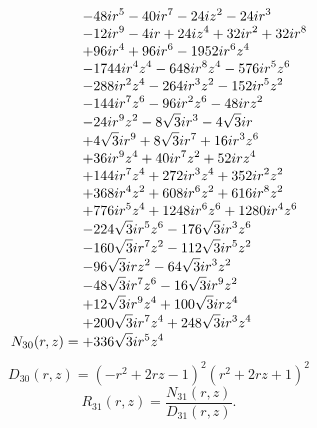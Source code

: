 \documentclass[11pt,a4paper]{article}
\begin{document}
\begin{equation}
N_{30}(r,z)=\shortstack[l]{$\displaystyle  - 48 i r^{5} - 40 i r^{7} - 24 i z^{2} - 24 i r^{3}$\\
$\displaystyle  - 12 i r^{9} - 4 i r + 24 i z^{4} + 32 i r^{2} + 32 i r^{8}$\\
$\displaystyle  + 96 i r^{4} + 96 i r^{6} - 1952 i r^{6} z^{4}$\\
$\displaystyle  - 1744 i r^{4} z^{4} - 648 i r^{8} z^{4} - 576 i r^{5} z^{6}$\\
$\displaystyle  - 288 i r^{2} z^{4} - 264 i r^{3} z^{2} - 152 i r^{5} z^{2}$\\
$\displaystyle  - 144 i r^{7} z^{6} - 96 i r^{2} z^{6} - 48 i r z^{2}$\\
$\displaystyle  - 24 i r^{9} z^{2} - 8 \sqrt{3} i r^{3} - 4 \sqrt{3} i r$\\
$\displaystyle  + 4 \sqrt{3} i r^{9} + 8 \sqrt{3} i r^{7} + 16 i r^{3} z^{6}$\\
$\displaystyle  + 36 i r^{9} z^{4} + 40 i r^{7} z^{2} + 52 i r z^{4}$\\
$\displaystyle  + 144 i r^{7} z^{4} + 272 i r^{3} z^{4} + 352 i r^{2} z^{2}$\\
$\displaystyle  + 368 i r^{4} z^{2} + 608 i r^{6} z^{2} + 616 i r^{8} z^{2}$\\
$\displaystyle  + 776 i r^{5} z^{4} + 1248 i r^{6} z^{6} + 1280 i r^{4} z^{6}$\\
$\displaystyle  - 224 \sqrt{3} i r^{5} z^{6} - 176 \sqrt{3} i r^{3} z^{6}$\\
$\displaystyle  - 160 \sqrt{3} i r^{7} z^{2} - 112 \sqrt{3} i r^{5} z^{2}$\\
$\displaystyle  - 96 \sqrt{3} i r z^{2} - 64 \sqrt{3} i r^{3} z^{2}$\\
$\displaystyle  - 48 \sqrt{3} i r^{7} z^{6} - 16 \sqrt{3} i r^{9} z^{2}$\\
$\displaystyle  + 12 \sqrt{3} i r^{9} z^{4} + 100 \sqrt{3} i r z^{4}$\\
$\displaystyle  + 200 \sqrt{3} i r^{7} z^{4} + 248 \sqrt{3} i r^{3} z^{4}$\\
$\displaystyle  + 336 \sqrt{3} i r^{5} z^{4}$}
\label{eq:cat-numerator-30}
\end{equation}
\begin{equation}
D_{30}(r,z)=\left(- r^{2} + 2 r z - 1\right)^{2} \left(r^{2} + 2 r z + 1\right)^{2}
\label{eq:cat-denominator-30}
\end{equation}
\begin{equation}
R_{31}(r,z)=\frac{N_{31}(r,z)}{D_{31}(r,z)}.
\label{eq:cat-rational-31}
\end{equation}
\end{document}
